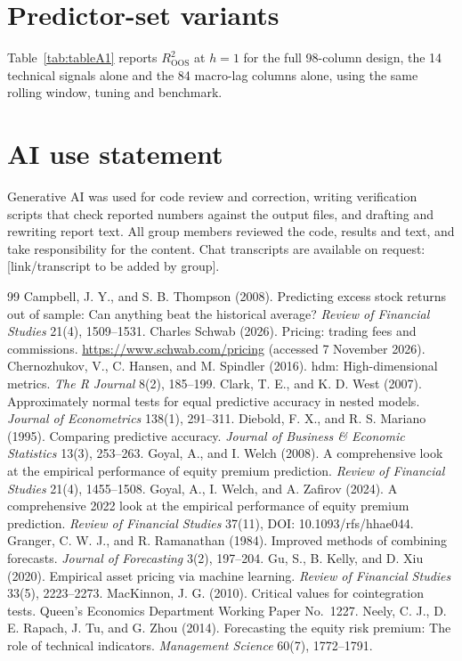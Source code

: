 \documentclass[11pt,a4paper]{article}
\begin{document}
\appendix
\section{Predictor-set variants}\label{app:variants}
Table~\ref{tab:tableA1} reports $R^2_{\mathrm{OOS}}$ at $h=1$ for the full
98-column design, the 14 technical signals alone and the 84 macro-lag
columns alone, using the same rolling window, tuning and benchmark.



\section*{AI use statement}
Generative AI was used for code review and correction, writing verification
scripts that check reported numbers against the output files, and drafting
and rewriting report text. All group members reviewed the code, results and
text, and take responsibility for the content. Chat transcripts are available on
request: [link/transcript to be added by group].

\begin{thebibliography}{99}
 Campbell, J. Y., and S. B. Thompson (2008). Predicting excess
stock returns out of sample: Can anything beat the historical average?
\emph{Review of Financial Studies} 21(4), 1509--1531.
 Charles Schwab (2026). Pricing: trading fees and
commissions. \url{https://www.schwab.com/pricing} (accessed 7 November 2026).
 Chernozhukov, V., C. Hansen, and M. Spindler (2016). hdm:
High-dimensional metrics. \emph{The R Journal} 8(2), 185--199.
 Clark, T. E., and K. D. West (2007). Approximately normal
tests for equal predictive accuracy in nested models. \emph{Journal of
Econometrics} 138(1), 291--311.
 Diebold, F. X., and R. S. Mariano (1995). Comparing predictive
accuracy. \emph{Journal of Business \& Economic Statistics} 13(3), 253--263.
 Goyal, A., and I. Welch (2008). A comprehensive look at the
empirical performance of equity premium prediction. \emph{Review of Financial
Studies} 21(4), 1455--1508.
 Goyal, A., I. Welch, and A. Zafirov (2024). A comprehensive
2022 look at the empirical performance of equity premium prediction.
\emph{Review of Financial Studies} 37(11), DOI: 10.1093/rfs/hhae044.
 Granger, C. W. J., and R. Ramanathan (1984). Improved methods
of combining forecasts. \emph{Journal of Forecasting} 3(2), 197--204.
 Gu, S., B. Kelly, and D. Xiu (2020). Empirical asset pricing
via machine learning. \emph{Review of Financial Studies} 33(5), 2223--2273.
 MacKinnon, J. G. (2010). Critical values for
cointegration tests. Queen's Economics Department Working Paper No.\ 1227.
 Neely, C. J., D. E. Rapach, J. Tu, and G. Zhou (2014).
Forecasting the equity risk premium: The role of technical indicators.
\emph{Management Science} 60(7), 1772--1791.
\end{thebibliography}
\end{document}
